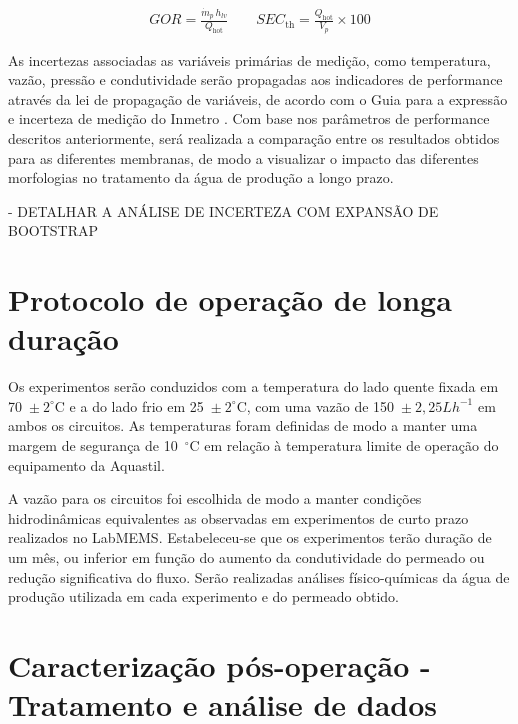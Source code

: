 \vspace{-0.8cm}
\begin{subequations}
\renewcommand{\theequation}{\theparentequation\ (a,b)}
\begin{equation}
\begin{aligned}
GOR = \frac{\dot{m}_p \, h_{lv}}{Q_{\mathrm{hot}}}
\qquad
SEC_{\mathrm{th}} =
\frac{Q_{\mathrm{hot}}}{V_p}
\times 100
\end{aligned}
\label{eq:SEC}
\end{equation}
\end{subequations}
\vspace{-0.8cm}

As incertezas associadas as variáveis primárias de medição, como temperatura, vazão, pressão e condutividade serão propagadas aos indicadores de performance através da lei de propagação de variáveis, de acordo com o Guia para a expressão e incerteza de medição do Inmetro \cite{INMETRO_GUM2012}. Com base nos parâmetros de performance descritos anteriormente, será realizada a comparação entre os resultados obtidos para as diferentes membranas, de modo a visualizar o impacto das diferentes morfologias no tratamento da água de produção a longo prazo. 

- DETALHAR A ANÁLISE DE INCERTEZA COM EXPANSÃO DE BOOTSTRAP


\section{Protocolo de operação de longa duração}

Os experimentos serão conduzidos com a temperatura do lado quente fixada em 70~$\pm~2 ^\circ$C e a do lado frio em 25~$\pm~2 ^\circ$C, com uma vazão de 150~$\pm~2,25 Lh^{-1}$ em ambos os circuitos. As temperaturas foram definidas de modo a manter uma margem de segurança de 10~$^\circ$C em relação à temperatura limite de operação do equipamento da Aquastil. 

A vazão para os circuitos foi escolhida de modo a manter condições hidrodinâmicas equivalentes as observadas em experimentos de curto prazo realizados no LabMEMS. Estabeleceu-se que os experimentos terão duração de um mês, ou inferior em função do aumento da condutividade do permeado ou redução significativa do fluxo. Serão realizadas análises físico-químicas da água de produção utilizada em cada experimento e do permeado obtido.

\section{Caracterização pós-operação - Tratamento e análise de dados}

